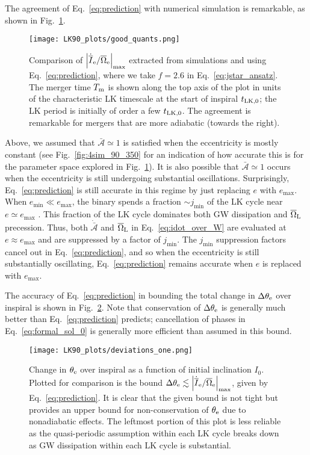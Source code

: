 \documentclass[
        twocolumn,
        twocolappendix
    ]{aastex63}
\newcommand*{\abs}[1]{\left|#1\right|}
\begin{document}
The agreement of Eq.~\eqref{eq:prediction} with numerical simulation is
remarkable, as shown in Fig.~\ref{fig:good_quants}.
\begin{figure}
    \centering
    \texttt{[image: LK90\_plots/good\_quants.png]}
    \caption{Comparison of $\abs{\dot{\overline{I}}_{\rm e} /
    \overline{\Omega}_{\rm e}}_{\max}$ extracted from simulations and using
    Eq.~\eqref{eq:prediction}, where we take $f = 2.6$ in
    Eq.~\eqref{eq:jstar_ansatz}. The merger time $T_{\rm m}$ is shown along the
    top axis of the plot in units of the characteristic LK timescale at the
    start of inspiral $t_{\rm LK, 0}$; the LK period is initially of order a few
    $t_{\rm LK, 0}$. The agreement is remarkable for mergers that are more
    adiabatic (towards the right).}\label{fig:good_quants}
\end{figure}

Above, we assumed that $\bar{\mathcal{A}} \simeq 1$ is satisfied when the
eccentricity is mostly constant (see Fig.~\ref{fig:4sim_90_350} for an
indication of how accurate this is for the parameter space explored in
Fig.~\ref{fig:good_quants}). It is also possible that $\bar{\mathcal{A}}
\simeq 1$ occurs when the eccentricity is still undergoing substantial
oscillations. Surprisingly, Eq.~\eqref{eq:prediction} is still accurate in this
regime by just replacing $e$ with $e_{\max}$. When $e_{\min} \ll e_{\max}$, the
binary spends a fraction $\sim j_{\min}$ of the LK cycle near $e \simeq
e_{\max}$ \citep{anderson2016formation}. This fraction of the LK cycle dominates
both GW dissipation and $\overline{\Omega}_{\rm L}$ precession. Thus, both
$\dot{\bar{\mathcal{A}}}$ and $\overline{\Omega}_{\rm L}$ in
Eq.~\eqref{eq:idot_over_W} are evaluated at $e \approx e_{\max}$ and are
suppressed by a factor of $j_{\min}$. The $j_{\min}$ suppression factors cancel
out in Eq.~\eqref{eq:prediction}, and so when the eccentricity is still
substantially oscillating, Eq.~\eqref{eq:prediction} remains accurate when $e$
is replaced with $e_{\max}$.

The accuracy of Eq.~\eqref{eq:prediction} in bounding the total change in
$\Delta \theta_{\rm e}$ over inspiral is shown in
Fig.~\ref{fig:deviations}. Note that conservation of $\Delta \theta_{\rm
e}$ is generally much better than Eq.~\eqref{eq:prediction} predicts;
cancellation of phases in Eq.~\eqref{eq:formal_sol_0} is generally more
efficient than assumed in this bound.
\begin{figure}
    \centering
    \texttt{[image: LK90\_plots/deviations\_one.png]}
    \caption{Change in $\theta_{\rm e}$ over inspiral as a function of initial
    inclination $I_0$. Plotted for comparison is the bound $\Delta \theta_{\rm
    e} \lesssim \abs{\dot{\overline{I}}_{\rm e} / \overline{\Omega}_{\rm
    e}}_{\max}$, given by Eq.~\eqref{eq:prediction}. It is clear that the given
    bound is not tight but provides an upper bound for non-conservation of
    $\theta_{\rm e}$ due to nonadiabatic effects. The leftmost portion of this
    plot is less reliable as the quasi-periodic assumption within each LK cycle
    breaks down as GW dissipation within each LK cycle is
    substantial.}\label{fig:deviations}
\end{figure}
\end{document}
